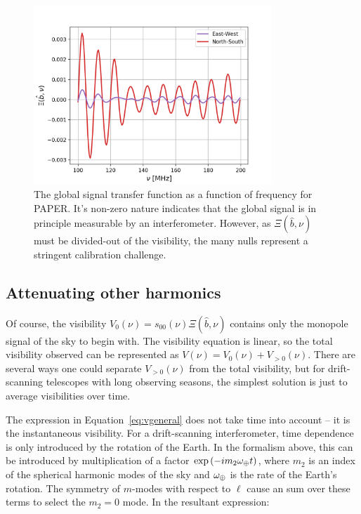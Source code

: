 \begin{figure}
\centering
\includegraphics[width=0.8\textwidth]{chapters/global_signal/figures/Xi_vis.png}
\caption[The global signal transfer function as a function of frequency for PAPER.]{The global signal transfer function as a function of frequency for PAPER. It's non-zero nature indicates that the global signal is in principle measurable by an interferometer. However, as $\Xi(\hat{b},\nu)$ must be divided-out of the visibility, the many nulls represent a stringent calibration challenge.}
\label{fig:xi_vis}
\end{figure}

\subsection{Attenuating other harmonics}

Of course, the visibility $V_0(\nu) = s_{00}(\nu)\Xi(\hat{b},\nu)$ contains only the monopole signal of the sky to begin with. The visibility equation is linear, so the total visibility observed can be represented as $V(\nu) = V_0(\nu) + V_{>0}(\nu)$. There are several ways one could separate $V_{>0}(\nu)$ from the total visibility, but for drift-scanning telescopes with long observing seasons, the simplest solution is just to average visibilities over time. 

The expression in Equation~\ref{eq:vgeneral} does not take time into account -- it is the instantaneous visibility. For a drift-scanning interferometer, time dependence is only introduced by the rotation of the Earth. In the formalism above, this can be introduced by multiplication of a factor $\exp\left(-i m_2 \omega_{\oplus} t\right)$, where $m_2$ is an index of the spherical harmonic modes of the sky and $\omega_{\oplus}$ is the rate of the Earth's rotation. The symmetry of $m$-modes with respect to $\ell$ cause an sum over these terms to select the $m_2=0$ mode. In the resultant expression:

